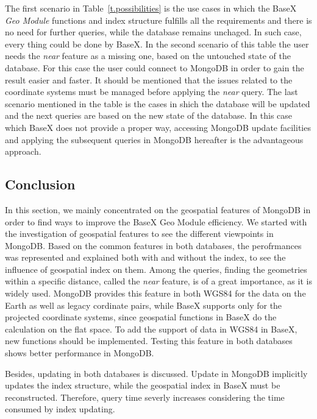 \documentclass[a4paper,12pt]{article}
\begin{document}
The first scenario in Table~\ref{t.possibilities} is the use cases in which the BaseX \textit{Geo Module} functions and index structure fulfills all the requirements and there is no need for further queries, while the database remains unchaged. In such case, every thing could be done by BaseX. In the second scenario of this table the user needs the \textit{near} feature as a missing one, based on the untouched state of the database. For this case the user could connect to MongoDB in order to gain the result easier and faster. It should be mentioned that the issues related to the coordinate systems must be managed before applying the \textit{near} query. The last scenario mentioned in the table is the cases in shich the database will be updated and the next queries are based on the new state of the database. In this case which BaseX does not provide a proper way, accessing MongoDB update facilities and applying the subsequent queries in MongoDB hereafter is the advantageous approach. 

\subsection{Conclusion}
\label{conc}
In this section, we mainly concentrated on the geospatial features of MongoDB in order to find ways to improve the BaseX Geo Module efficiency. We started with the investigation of geospatial features to see the different viewpoints in MongoDB. Based on the common features in both databases, the perofrmances was represented and explained both with and without the index, to see the influence of geospatial index on them.
Among the queries, finding the geometries within a specific distance, called the \textit{near} feature, is of a great importance, as it is widely used. MongoDB provides this feature in both WGS84 for the data on the Earth as well as legacy cordinate pairs, while BaseX supports only for the projected coordinate systems, since geospatial functions in BaseX do the calculation on the flat space. To add the support of data in WGS84 in BaseX, new functions should be implemented. Testing this feature in both databases shows better performance in MongoDB. 

Besides, updating in both databases is discussed. Update in MongoDB implicitly updates the index structure, while the geospatial index in BaseX must be reconstructed. Therefore, query time severly increases considering the time consumed by index updating. 
\end{document}
